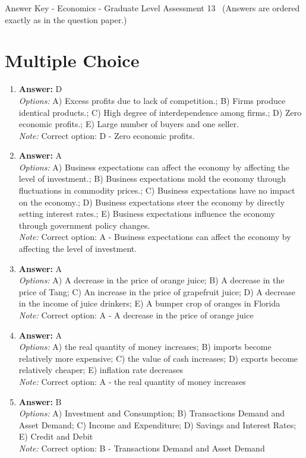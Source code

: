 \documentclass[12pt]{article}
\begin{document}
\begin{center}
Answer Key - Economics - Graduate Level Assessment 13 \
\small (Answers are ordered exactly as in the question paper.)
\end{center}

\section*{Multiple Choice}
\begin{enumerate}[label=\arabic*.]
\item \textbf{Answer:} D
\\ \textit{Options:} A) Excess profits due to lack of competition.; B) Firms produce identical products.; C) High degree of interdependence among firms.; D) Zero economic profits.; E) Large number of buyers and one seller.
\\ \textit{Note:} Correct option: D - Zero economic profits.
\item \textbf{Answer:} A
\\ \textit{Options:} A) Business expectations can affect the economy by affecting the level of investment.; B) Business expectations mold the economy through fluctuations in commodity prices.; C) Business expectations have no impact on the economy.; D) Business expectations steer the economy by directly setting interest rates.; E) Business expectations influence the economy through government policy changes.
\\ \textit{Note:} Correct option: A - Business expectations can affect the economy by affecting the level of investment.
\item \textbf{Answer:} A
\\ \textit{Options:} A) A decrease in the price of orange juice; B) A decrease in the price of Tang; C) An increase in the price of grapefruit juice; D) A decrease in the income of juice drinkers; E) A bumper crop of oranges in Florida
\\ \textit{Note:} Correct option: A - A decrease in the price of orange juice
\item \textbf{Answer:} A
\\ \textit{Options:} A) the real quantity of money increases; B) imports become relatively more expensive; C) the value of cash increases; D) exports become relatively cheaper; E) inflation rate decreases
\\ \textit{Note:} Correct option: A - the real quantity of money increases
\item \textbf{Answer:} B
\\ \textit{Options:} A) Investment and Consumption; B) Transactions Demand and Asset Demand; C) Income and Expenditure; D) Savings and Interest Rates; E) Credit and Debit
\\ \textit{Note:} Correct option: B - Transactions Demand and Asset Demand
\end{enumerate}
\end{document}
